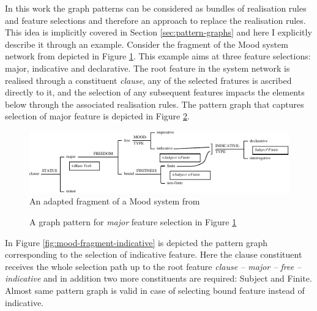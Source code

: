 
In this work the graph patterns can be considered as bundles of realisation rules and feature selections and therefore an approach to replace the realisation rules. This idea is implicitly covered in Section \ref{sec:pattern-graphs} and here I explicitly describe it through an example. Consider the fragment of the Mood system network from \citet[162]{Halliday2013} depicted in Figure \ref{fig:mood-fragment}. This example aims at three feature selections: major, indicative and declarative. The root feature in the system network is realised through a constituent \textit{clause}, any of the selected fratures is ascribed directly to it, and the selection of any subsequent features impacts the elements below through the associated realisation rules. The pattern graph that captures selection of major feature is depicted in Figure \ref{fig:mood-fragment-major}. 

\begin{figure}[!ht]
    \centering
    \includegraphics[width=\textwidth]{Figures/Example/mood-fragment.pdf}
    \caption{An adapted fragment of a Mood system from \citep[162]{Halliday2013} }
    \label{fig:mood-fragment}
\end{figure}

\begin{figure}[!ht]
    \centering
    \caption{A graph pattern for \textit{major} feature selection in Figure \ref{fig:mood-fragment}}
    \label{fig:mood-fragment-major}
\end{figure}

In Figure \ref{fig:mood-fragment-indicative} is depicted the pattern graph corresponding to the selection of indicative feature. Here the clause constituent receives the whole selection path up to the root feature \textit{clause -- major -- free -- indicative} and in addition two more constituents are required: Subject and Finite. Almost same pattern graph is valid in case of selecting bound feature instead of indicative.

